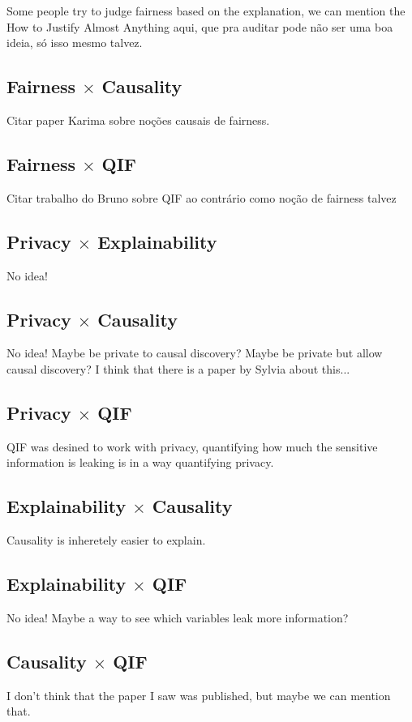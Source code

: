 {\color{red} Some people try to judge fairness based on the explanation, we can mention the How to Justify Almost Anything aqui, que pra auditar pode não ser uma boa ideia, só isso mesmo talvez.}

\subsection{Fairness $\times$ Causality}

{\color{red} Citar paper Karima sobre noções causais de fairness.}

\subsection{Fairness $\times$ QIF}

{\color{red} Citar trabalho do Bruno sobre QIF ao contrário como noção de fairness talvez}

\subsection{Privacy $\times$ Explainability}

{\color{red} No idea!}

\subsection{Privacy $\times$ Causality}

{\color{red} No idea! Maybe be private to causal discovery? Maybe be private but allow causal discovery? I think that there is a paper by Sylvia about this...}

\subsection{Privacy $\times$ QIF}

{\color{red} QIF was desined to work with privacy, quantifying how much the sensitive information is leaking is in a way quantifying privacy.}

\subsection{Explainability $\times$ Causality}

{\color{red} Causality is inheretely easier to explain.}

\subsection{Explainability $\times$ QIF}

{\color{red} No idea! Maybe a way to see which variables leak more information?}

\subsection{Causality $\times$ QIF}

{\color{red} I don't think that the paper I saw was published, but maybe we can mention that.}

